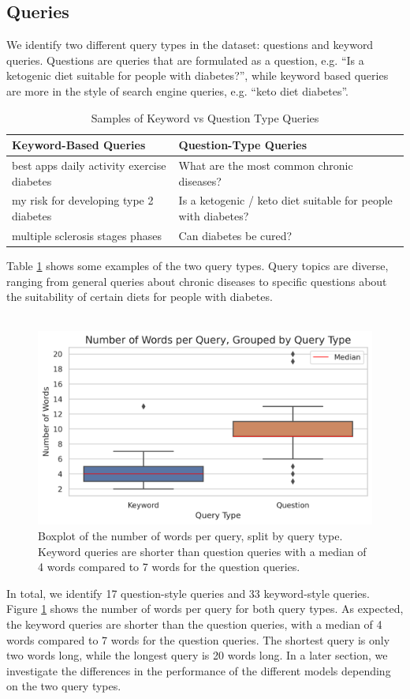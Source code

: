 \subsection{Queries}
We identify two different query types in the dataset: questions and keyword queries.
Questions are queries that are formulated as a question, e.g. ``Is a ketogenic diet suitable for people with diabetes?'', while keyword based queries are more in the style of search engine queries, e.g. ``keto diet diabetes''.
\begin{table}[tb]
\centering
\begin{tabularx}{\textwidth}{XX}
\hline
\textbf{Keyword-Based Queries} & \textbf{Question-Type Queries} \\
\hline
best apps daily activity exercise diabetes & What are the most common chronic diseases? \\
\hline
my risk for developing type 2 diabetes & Is a ketogenic / keto diet suitable for people with diabetes? \\
\hline
multiple sclerosis stages phases & Can diabetes be cured? \\
\hline
\end{tabularx}
\caption{Samples of Keyword vs Question Type Queries}
\label{table:querie-samples}
\end{table}
Table \ref{table:querie-samples} shows some examples of the two query types.
Query topics are diverse, ranging from general queries about chronic diseases to specific questions about the suitability of certain diets for people with diabetes.
\\\\
\begin{figure}
\centering
\includegraphics[width=\textwidth]{images/num_words_per_query.png}
\caption{Boxplot of the number of words per query, split by query type. Keyword queries are shorter than question queries with a median of 4 words compared to 7 words for the question queries.}
\label{fig:num_words_per_query}
\end{figure}
In total, we identify 17 question-style queries and 33 keyword-style queries.
Figure \ref{fig:num_words_per_query} shows the number of words per query for both query types.
As expected, the keyword queries are shorter than the question queries, with a median of 4 words compared to 7 words for the question queries.
The shortest query is only two words long, while the longest query is 20 words long.
In a later section, we investigate the differences in the performance of the different models depending on the two query types.
